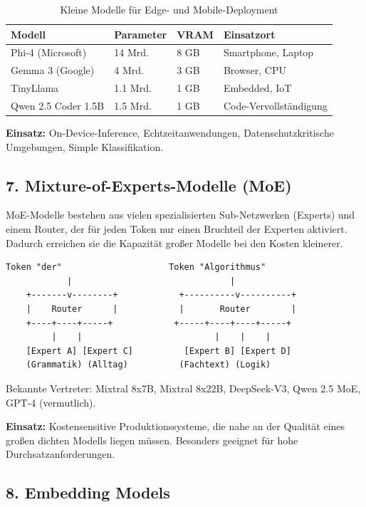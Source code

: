 \begin{table}[H]
\centering
\begin{tabularx}{\linewidth}{lXXX}
\toprule
\textbf{Modell} & \textbf{Parameter} & \textbf{VRAM} & \textbf{Einsatzort} \\
\midrule
Phi-4 (Microsoft) & 14 Mrd. & 8 GB & Smartphone, Laptop \\
Gemma 3 (Google) & 4 Mrd. & 3 GB & Browser, CPU \\
TinyLlama & 1.1 Mrd. & 1 GB & Embedded, IoT \\
Qwen 2.5 Coder 1.5B & 1.5 Mrd. & 1 GB & Code-Vervollständigung \\
\bottomrule
\end{tabularx}
\caption{Kleine Modelle für Edge- und Mobile-Deployment}
\label{tab:slm-modelle}
\end{table}

\textbf{Einsatz:} On-Device-Inference, Echtzeitanwendungen, Datenschutzkritische Umgebungen, Simple Klassifikation.

\subsection{7. Mixture-of-Experts-Modelle (MoE)}

MoE-Modelle bestehen aus vielen spezialisierten Sub-Netzwerken (Experts) und einem Router, der für jeden Token nur einen Bruchteil der Experten aktiviert. Dadurch erreichen sie die Kapazität großer Modelle bei den Kosten kleinerer.

\begin{verbatim}
Token "der"                     Token "Algorithmus"
            |                               |
    +-------v--------+            +----------v----------+
    |    Router      |            |       Router        |
    +----+----+-----+            +-----+----+----+-----+
         |    |                          |    |    |
    [Expert A] [Expert C]          [Expert B] [Expert D]
    (Grammatik) (Alltag)          (Fachtext) (Logik)
\end{verbatim}

Bekannte Vertreter: Mixtral 8x7B, Mixtral 8x22B, DeepSeek-V3, Qwen 2.5 MoE, GPT-4 (vermutlich).

\textbf{Einsatz:} Kostensensitive Produktionssysteme, die nahe an der Qualität eines großen dichten Modells liegen müssen. Besonders geeignet für hohe Durchsatzanforderungen.

\subsection{8. Embedding Models}


